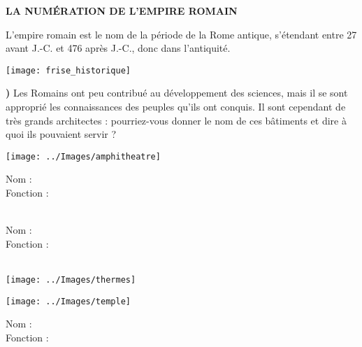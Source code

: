 \documentclass[12pt,a4paper]{article}
\begin{document}
\thispagestyle{empty}


\begin{center}
   \bf LA NUMÉRATION DE L'EMPIRE ROMAIN \\ [1cm]
\end{center}
   
\noindent L'empire romain est le nom de la période de la Rome antique, s'étendant entre 27 avant J.-C. et 476 après J.-C., donc dans l'antiquité.

\begin{center}
   \texttt{[image: frise\_historique]}
\end{center}

{\bf{})} Les Romains ont peu contribué au développement des sciences, mais il se sont approprié les connaissances des peuples qu'ils ont conquis. Il sont cependant de très grands architectes : pourriez-vous donner le nom de ces bâtiments et dire à quoi ils pouvaient servir ? \\
   
\begin{minipage}{6cm}
   \texttt{[image: ../Images/amphitheatre]}
\end{minipage}
\qquad
\begin{minipage}{10cm}
   Nom :  \\ [3mm]
   Fonction :  \\ [3mm]
   \mbox{}  \\ [3mm]
\end{minipage}

\bigskip

\begin{minipage}{11cm}
   Nom :  \\ [3mm]
   Fonction :  \\ [3mm]
   \mbox{} \\ [3mm]
\end{minipage}
\qquad
\begin{minipage}{5cm}
   \texttt{[image: ../Images/thermes]}
\end{minipage}

\bigskip

\begin{minipage}{4.5cm}
   \texttt{[image: ../Images/temple]}
\end{minipage}
\qquad
\begin{minipage}{11.5cm}
   Nom :  \\ [3mm]
   Fonction :  \\ [3mm]
   \mbox{} \\ [3mm]
\end{minipage}
\end{document}
